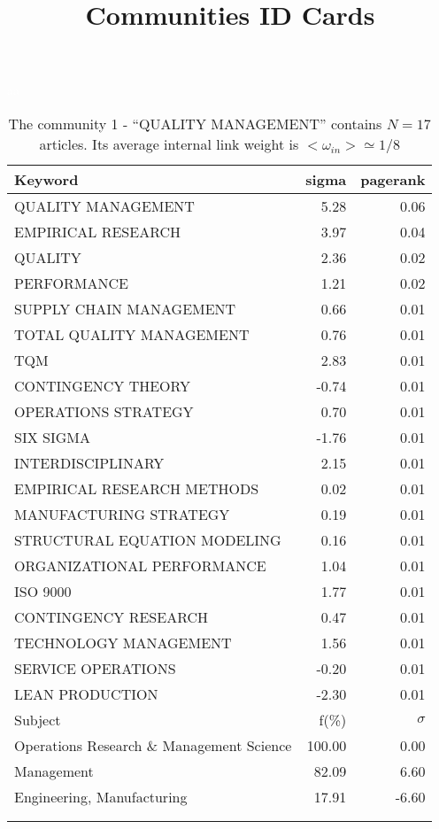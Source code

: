 \documentclass[a4paper,11pt]{report}
\title{{\bf Communities ID Cards}}
\date{\begin{flushleft}This document gather the ``ID Cards'' of the CC communities found within your database.\\
 The CC network was built by keeping a link between articles sharing at least 5 references. The communities characterized here correspond to the ones found in the level 1 (in the sense of the Louvain algo) which gathers more than 0 articles.\\
 These ID cards displays the most frequent keywords, subject categories, journals of publication, institution, countries, authors, references and reference journals of the articles of each community. The significance of an item $\sigma = \sqrt{N} (f - p) / \sqrt{p(1-p)}$ [where $N$ is the number of articles within the community and $f$ and $p$ are the proportion of articles respectively within the community and within the database displaying that item ] is also given (for example $\sigma > 5$ is really highly significant). The tf-idf value which can be calculated by $tf-idf = f*log(1/p)$ is also given.\\
\vspace{1cm}
\copyright Sebastian Grauwin, Liu Weizhi - (2014) \end{flushleft}}
\begin{document}
\begin{landscape}
\maketitle
\clearpage

\begin{table}[!ht]
\caption{The community 1 - ``QUALITY MANAGEMENT'' contains $N = 17$ articles. Its average internal link weight is $<\omega_{in}> \simeq 1/8$ }
\textcolor{white}{aa}\\
{\scriptsize\begin{tabular}{|l r  r|}
\hline
Keyword & sigma & pagerank \\
\hline
QUALITY MANAGEMENT & 5.28 & 0.06\\
EMPIRICAL RESEARCH & 3.97 & 0.04\\
QUALITY & 2.36 & 0.02\\
PERFORMANCE & 1.21 & 0.02\\
SUPPLY CHAIN MANAGEMENT & 0.66 & 0.01\\
TOTAL QUALITY MANAGEMENT & 0.76 & 0.01\\
TQM & 2.83 & 0.01\\
CONTINGENCY THEORY & -0.74 & 0.01\\
OPERATIONS STRATEGY & 0.70 & 0.01\\
SIX SIGMA & -1.76 & 0.01\\
INTERDISCIPLINARY & 2.15 & 0.01\\
EMPIRICAL RESEARCH METHODS & 0.02 & 0.01\\
MANUFACTURING STRATEGY & 0.19 & 0.01\\
STRUCTURAL EQUATION MODELING & 0.16 & 0.01\\
ORGANIZATIONAL PERFORMANCE & 1.04 & 0.01\\
ISO 9000 & 1.77 & 0.01\\
CONTINGENCY RESEARCH & 0.47 & 0.01\\
TECHNOLOGY MANAGEMENT & 1.56 & 0.01\\
SERVICE OPERATIONS & -0.20 & 0.01\\
LEAN PRODUCTION & -2.30 & 0.01\\
\hline
\hline
Subject & f(\%) & $\sigma$\\
\hline
Operations Research \& Management Science & 100.00 & 0.00\\
Management & 82.09 & 6.60\\
Engineering, Manufacturing & 17.91 & -6.60\\
 &  & \\
 &  & \\

\end{tabular}}
\end{table}
\end{landscape}
\end{document}
